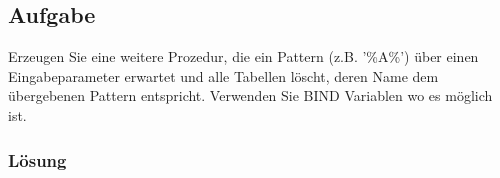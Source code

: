 \subsection{Aufgabe}
\label{subsec:uebung_02.aufgabe_06}
Erzeugen Sie eine weitere Prozedur, die ein Pattern (z.B. '\%A\%') über einen Eingabeparameter erwartet und alle Tabellen löscht, deren Name dem übergebenen Pattern entspricht. Verwenden Sie BIND Variablen wo es möglich ist.

\subsubsection*{Lösung}
\label{subsubsec:uebung_02.aufgabe_06.loesung}
